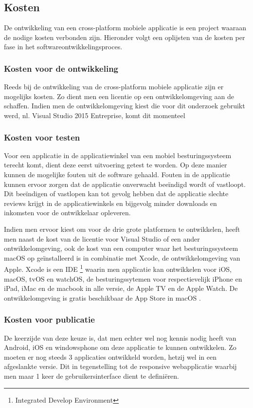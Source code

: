 \subsection{Kosten}
De ontwikkeling van een cross-platform mobiele applicatie is een project waaraan de nodige kosten verbonden zijn.
Hieronder volgt een oplijsten van de kosten per fase in het softwareontwikkelingsproces.

\subsubsection{Kosten voor de ontwikkeling}
Reeds bij de ontwikkeling van de cross-platform mobiele applicatie zijn er mogelijks kosten. Zo dient men een licentie op een ontwikkelomgeving
aan de schaffen. Indien men de ontwikkelomgeving kiest die voor dit onderzoek gebruikt werd, nl. Visual Studio 2015 Entreprise, komt dit momenteel

\subsubsection{Kosten voor testen}
Voor een applicatie in de applicatiewinkel van een mobiel besturingssysteem terecht komt, dient deze eerst uitvoering getest te
worden. Op deze manier kunnen de mogelijke fouten uit de software gehaald. Fouten in de applicatie kunnen ervoor zorgen dat de applicatie
onverwacht beeïndigd wordt of vastloopt.
Dit beeïndigen of vastlopen kan tot gevolg hebben dat de applicatie slechte reviews krijgt in de applicatiewinkels en bijgevolg minder downloads en inkomsten voor de ontwikkelaar opleveren.

Indien men ervoor kiest om voor de drie grote platformen te ontwikkelen, heeft men naast de kost van de licentie voor Visual Studio of een ander ontwikkelomgeving,
ook de kost van een computer waar het besturingssysteem macOS op geïnstalleerd is in combinatie met Xcode, de ontwikkelomgeving van Apple.
Xcode is een IDE \footnote{Integrated Develop Environment} waarin men applicatie kan ontwikkelen voor iOS, macOS, tvOS en watchOS, de besturingssytemen voor respectievelijk iPhone en iPad,
iMac en de macbook in alle versie, de Apple TV en de Apple Watch. De ontwikkelomgeving is gratis beschikbaar de App Store in macOS \citep{xcodemacappstore2017}.

\subsubsection{Kosten voor publicatie}
De keerzijde van deze keuze is, dat men echter wel nog kennis nodig heeft van Android, iOS en windowsphone om deze applicatie te
kunnen ontwikkelen. Zo moeten er nog steeds 3 applicaties ontwikkeld worden, hetzij wel in een afgeslankte versie.
Dit in tegenstelling tot de responsive webapplicatie waarbij men maar 1 keer de gebruikersinterface dient te definiëren.

